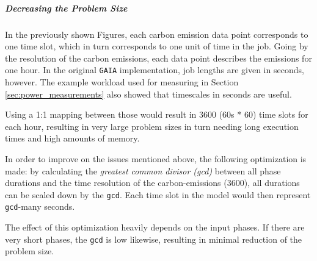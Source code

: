 \subparagraph{Decreasing the Problem Size}

In the previously shown Figures, each carbon emission data point corresponds to one time slot, which in turn corresponds to one unit of time in the job. 
Going by the resolution of the carbon emissions, each data point describes the emissions for one hour. 
In the original \verb|GAIA| implementation, job lengths are given in seconds, however. 
The example workload used for measuring in Section \ref{sec:power_measurements} also showed that timescales in seconds are useful. 

Using a 1:1 mapping between those would result in 3600 (60s * 60) time slots for each hour, resulting in very large problem sizes in turn needing long execution times and high amounts of memory.

In order to improve on the issues mentioned above, the following optimization is made: by calculating the \emph{greatest common divisor (gcd)} between all phase durations and the time resolution of the carbon-emissions (3600), all durations can be scaled down by the \verb|gcd|. Each time slot in the model would then represent \verb|gcd|-many seconds.

The effect of this optimization heavily depends on the input phases. 
If there are very short phases, the \verb|gcd| is low likewise, resulting in minimal reduction of the problem size.

